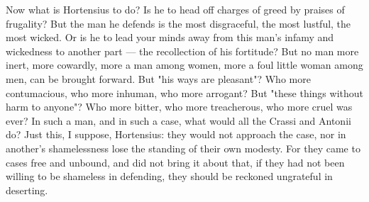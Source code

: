  Now what is Hortensius to do? Is he to head off charges of greed by praises of frugality? But the man he defends is the most disgraceful, the most lustful, the most wicked. Or is he to lead your minds away from this man's infamy and wickedness to another part --- the recollection of his fortitude? But no man more inert, more cowardly, more a man among women, more a foul little woman among men, can be brought forward. But "his ways are pleasant"? Who more contumacious, who more inhuman, who more arrogant? But "these things without harm to anyone"? Who more bitter, who more treacherous, who more cruel was ever? In such a man, and in such a case, what would all the Crassi and Antonii do? Just this, I suppose, Hortensius: they would not approach the case, nor in another's shamelessness lose the standing of their own modesty. For they came to cases free and unbound, and did not bring it about that, if they had not been willing to be shameless in defending, they should be reckoned ungrateful in deserting.


